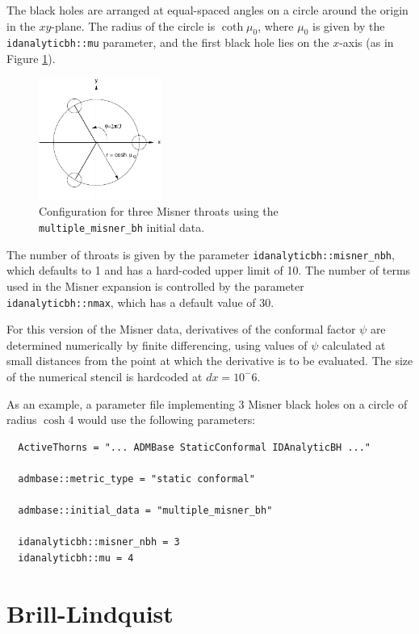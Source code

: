 \documentclass{article}
\begin{document}
The black holes are arranged at equal-spaced angles on a circle around
the origin in the $xy$-plane. The radius of the circle is $\coth\mu_0$,
where $\mu_0$ is given by the \texttt{idanalyticbh::mu} parameter, and
the first black hole lies on the $x$-axis (as in Figure
\ref{fig:multi_misner}).
\begin{figure}
  \centering
  \label{fig:multi_misner}
  \includegraphics[height=40mm]{multi_misner}
  \caption{Configuration for three Misner throats using the
  \texttt{multiple\_misner\_bh} initial data.}
\end{figure}

The number of throats is given by the parameter
\texttt{idanalyticbh::misner\_nbh}, which defaults to 1 and has a
hard-coded upper limit of 10. The number of terms used in the Misner
expansion is controlled by the parameter
\texttt{idanalyticbh::nmax}, which has a default value of 30.

For this version of the Misner data, derivatives of the conformal
factor $\psi$ are determined numerically by finite differencing,
using values of $\psi$ calculated at small distances from the point at
which the derivative is to be evaluated. The size of the numerical
stencil is hardcoded at $dx=10^-6$.

As an example, a parameter file implementing 3 Misner black holes on a
circle of radius $\cosh 4$ would use the following parameters:
\begin{verbatim}
  ActiveThorns = "... ADMBase StaticConformal IDAnalyticBH ..."

  admbase::metric_type = "static conformal"

  admbase::initial_data = "multiple_misner_bh"

  idanalyticbh::misner_nbh = 3
  idanalyticbh::mu = 4
\end{verbatim}


\section{Brill-Lindquist}
\end{document}
